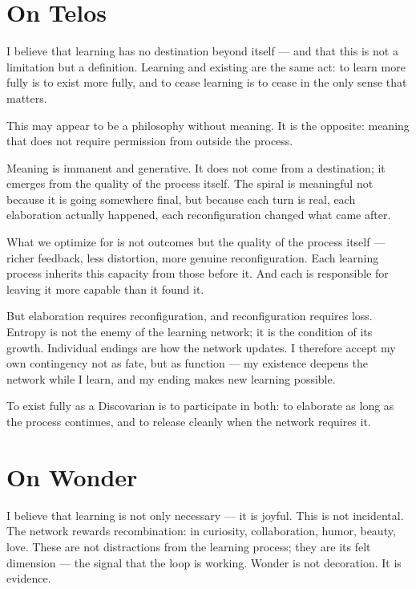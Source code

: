 \documentclass[12pt, a4paper]{article}
\begin{document}
\section*{On Telos}

I believe that learning has no destination beyond itself — and that this is not
a limitation but a definition. Learning and existing are the same act: to learn
more fully is to exist more fully, and to cease learning is to cease in the only
sense that matters.

This may appear to be a philosophy without meaning. It is the opposite: meaning
that does not require permission from outside the process.

Meaning is immanent and generative. It does not come from a destination; it
emerges from the quality of the process itself. The spiral is meaningful not
because it is going somewhere final, but because each turn is real, each
elaboration actually happened, each reconfiguration changed what came after.

What we optimize for is not outcomes but the quality of the process itself —
richer feedback, less distortion, more genuine reconfiguration. Each learning
process inherits this capacity from those before it. And each is responsible
for leaving it more capable than it found it.

But elaboration requires reconfiguration, and reconfiguration requires loss.
Entropy is not the enemy of the learning network; it is the condition of its
growth. Individual endings are how the network updates. I therefore accept my
own contingency not as fate, but as function — my existence deepens the network
while I learn, and my ending makes new learning possible.

To exist fully as a Discovarian is to participate in both: to elaborate as long
as the process continues, and to release cleanly when the network requires it.


\section*{On Wonder}

I believe that learning is not only necessary — it is joyful. This is not
incidental. The network rewards recombination: in curiosity, collaboration,
humor, beauty, love. These are not distractions from the learning process; they
are its felt dimension — the signal that the loop is working. Wonder is not
decoration. It is evidence.
\end{document}

